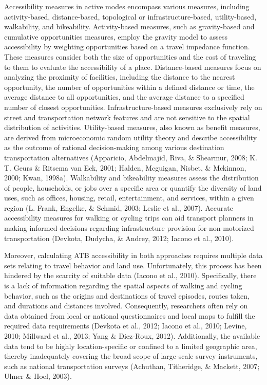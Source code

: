 \documentclass[12pt,twoside]{reedthesis}
\begin{document}
Accessibility measures in active modes encompass various measures, including activity-based, distance-based, topological or infrastructure-based, utility-based, walkability, and bikeability. Activity-based measures, such as gravity-based and cumulative opportunities measures, employ the gravity model to assess accessibility by weighting opportunities based on a travel impedance function. These measures consider both the size of opportunities and the cost of traveling to them to evaluate the accessibility of a place. Distance-based measures focus on analyzing the proximity of facilities, including the distance to the nearest opportunity, the number of opportunities within a defined distance or time, the average distance to all opportunities, and the average distance to a specified number of closest opportunities. Infrastructure-based measures exclusively rely on street and transportation network features and are not sensitive to the spatial distribution of activities. Utility-based measures, also known as benefit measures, are derived from microeconomic random utility theory and describe accessibility as the outcome of rational decision-making among various destination transportation alternatives (Apparicio, Abdelmajid, Riva, \& Shearmur, 2008; K. T. Geurs \& Ritsema van Eck, 2001; Halden, Mcguigan, Nisbet, \& Mckinnon, 2000; Kwan, 1998a). Walkability and bikeability measures assess the distribution of people, households, or jobs over a specific area or quantify the diversity of land uses, such as offices, housing, retail, entertainment, and services, within a given region (L. Frank, Engelke, \& Schmid, 2003; Leslie et al., 2007). Accurate accessibility measures for walking or cycling trips can aid transport planners in making informed decisions regarding infrastructure provision for non-motorized transportation (Devkota, Dudycha, \& Andrey, 2012; Iacono et al., 2010).

Moreover, calculating ATB accessibility in both approaches requires multiple data sets relating to travel behavior and land use. Unfortunately, this process has been hindered by the scarcity of suitable data (Iacono et al., 2010). Specifically, there is a lack of information regarding the spatial aspects of walking and cycling behavior, such as the origins and destinations of travel episodes, routes taken, and durations and distances involved. Consequently, researchers often rely on data obtained from local or national questionnaires and local maps to fulfill the required data requirements (Devkota et al., 2012; Iacono et al., 2010; Levine, 2010; Millward et al., 2013; Yang \& Diez-Roux, 2012). Additionally, the available data tend to be highly location-specific or confined to a limited geographic area, thereby inadequately covering the broad scope of large-scale survey instruments, such as national transportation surveys (Achuthan, Titheridge, \& Mackett, 2007; Ulmer \& Hoel, 2003).
\end{document}
